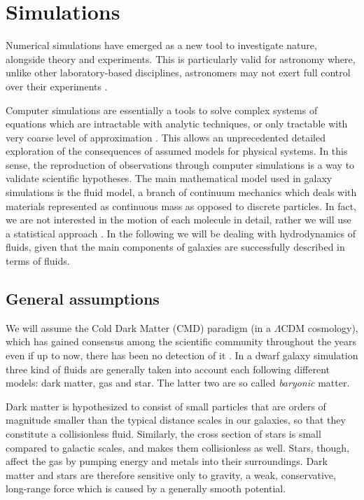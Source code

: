 
\chapter{Simulations}
\label{ch:simulations}

Numerical simulations have emerged as a new tool to investigate nature, alongside theory and experiments.
This is particularly valid for astronomy where, unlike other laboratory-based disciplines, astronomers may not exert full control over their experiments \citep{Heng2014}.

Computer simulations are essentially a tools to solve complex systems of equations which are intractable with analytic techniques, or only tractable with very coarse level of approximation \citep{Springel2015}.
This allows an unprecedented detailed exploration of the consequences of assumed models for physical systems.
In this sense, the reproduction of observations through computer simulations is a way to validate scientific hypotheses.
The main mathematical model used in galaxy simulations is the fluid model, a branch of continuum mechanics which deals with materials represented as continuous mass as opposed to discrete particles.
In fact, we are not interested in the motion of each molecule in detail, rather we will use a statistical approach . 
In the following we will be dealing with hydrodynamics of fluids, given that the main components of galaxies are successfully described in terms of fluids.

\section{General assumptions}
We will assume the Cold Dark Matter (CMD) paradigm (in a $\Lambda$CDM cosmology), which has gained consensus among the scientific community throughout the years even if up to now, there has been no detection of it \citep[see e.g.][for an extensive and historical overview]{Einasto2010}.
In a dwarf galaxy simulation three kind of fluids are generally taken into account each following different models: dark matter, gas and star. The latter two are so called \emph{baryonic} matter.

Dark matter is hypothesized to consist of small particles that are orders of magnitude smaller than the typical distance scales in our galaxies, so that they constitute a collisionless fluid.
Similarly, the cross section of stars is small compared to galactic scales, and makes them collisionless as well.
Stars, though, affect the gas by pumping energy and metals into their surroundings.
Dark matter and stars are therefore sensitive only to gravity, a weak, conservative, long-range force which is caused by a generally smooth potential.


